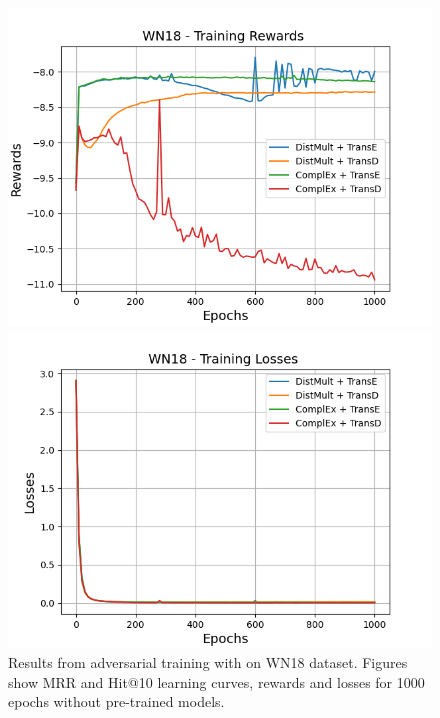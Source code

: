 \begin{figure}[H]
    \begin{minipage}{.45\textwidth}
      \centering
      \includegraphics[width=0.9\linewidth]{figures/results/gan_train/not_pretrained/uncertainty/max/entropy/wn18/1k_epochs/uncertainty_wn18_rew.png}
    \end{minipage}%
     \begin{minipage}{.45\textwidth}
      \centering
      \includegraphics[width=0.9\linewidth]{figures/results/gan_train/not_pretrained/uncertainty/max/entropy/wn18/1k_epochs/uncertainty_wn18_losses.png}
    \end{minipage}%
    \caption{Results from adversarial training with \usmax on \textsc{WN18} dataset.
    Figures show MRR and Hit@10 learning curves, rewards and losses for 1000 epochs without pre-trained models.}
    \label{fig:gan_train_not_pretrained_usmax_wn18}
\end{figure}
